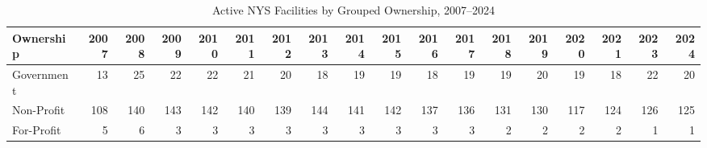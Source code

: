 \documentclass{article}
\begin{document}
\begin{landscape}\begin{table}[htbp]\centering\caption{Active NYS Facilities by Grouped Ownership, 2007--2024}\small
\begin{tabular}{lrrrrrrrrrrrrrrrrr}
\toprule
Ownership & 2007 & 2008 & 2009 & 2010 & 2011 & 2012 & 2013 & 2014 & 2015 & 2016 & 2017 & 2018 & 2019 & 2020 & 2021 & 2023 & 2024 \\
\midrule
Government & 13 & 25 & 22 & 22 & 21 & 20 & 18 & 19 & 19 & 18 & 19 & 19 & 20 & 19 & 18 & 22 & 20 \\
Non-Profit & 108 & 140 & 143 & 142 & 140 & 139 & 144 & 141 & 142 & 137 & 136 & 131 & 130 & 117 & 124 & 126 & 125 \\
For-Profit & 5 & 6 & 3 & 3 & 3 & 3 & 3 & 3 & 3 & 3 & 3 & 2 & 2 & 2 & 2 & 1 & 1 \\
\bottomrule
\end{tabular}
\end{table}\end{landscape}
\end{document}
